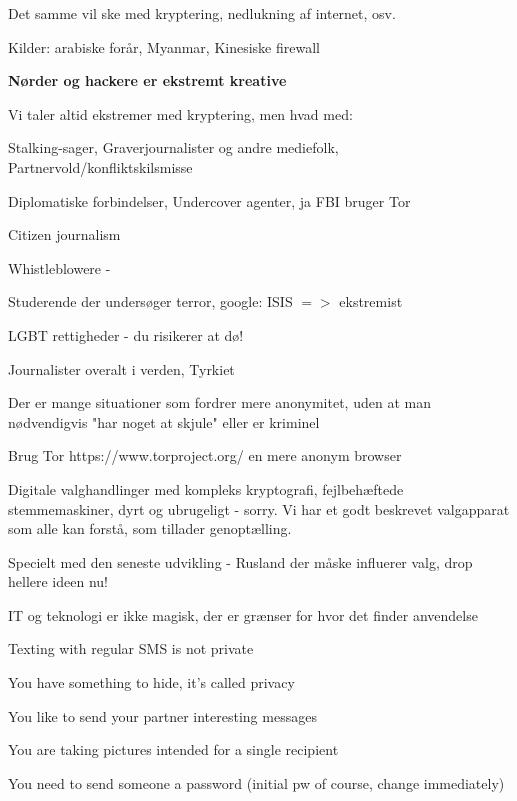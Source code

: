 \documentclass[20pt,landscape,a4paper,footrule]{foils}
\begin{document}
Det samme vil ske med kryptering, nedlukning af internet, osv.

Kilder: arabiske forår, Myanmar, Kinesiske firewall

\vskip 1cm
\centerline{\bf Nørder og hackere er ekstremt kreative}




Vi taler altid ekstremer med kryptering, men hvad med:
\begin{list2}
\item Stalking-sager, Graverjournalister og andre mediefolk, Partnervold/konfliktskilsmisse
\item Diplomatiske forbindelser, Undercover agenter, ja FBI bruger Tor
\item Citizen journalism 
\item Whistleblowere - 
\item Studerende der undersøger terror, google: ISIS $=>$ ekstremist
\item LGBT rettigheder - du risikerer at dø!
\item Journalister overalt i verden, Tyrkiet
\end{list2}

Der er mange situationer som fordrer mere anonymitet, uden at man nødvendigvis "har noget at skjule" eller er kriminel

Brug Tor https://www.torproject.org/ en mere anonym browser


Digitale valghandlinger med kompleks kryptografi, fejlbehæftede stemmemaskiner, dyrt og ubrugeligt - sorry. Vi har et godt beskrevet valgapparat som alle kan forstå, som tillader genoptælling.

Specielt med den seneste udvikling - Rusland der måske influerer
valg, drop hellere ideen nu!

IT og teknologi er ikke magisk, der er grænser for hvor det finder anvendelse




\begin{list2}
\item Texting with regular SMS is not private
\item You have something to hide, it's called privacy
\item You like to send your partner interesting messages
\item You are taking pictures intended for a single recipient
\item You need to send someone a password (initial pw of course, change immediately)
\end{list2}
\end{document}
